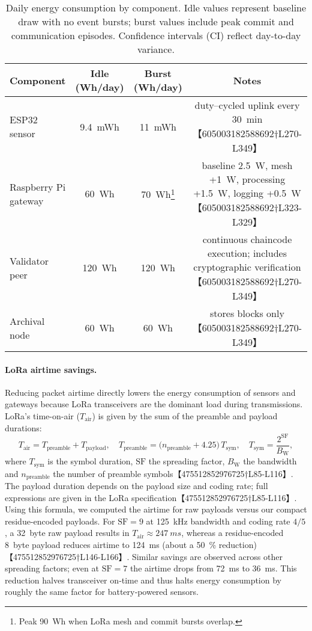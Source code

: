 \begin{table}[ht]
  \centering
  \caption{Daily energy consumption by component.  Idle values represent baseline draw with no event bursts; burst values include peak commit and communication episodes.  Confidence intervals (CI) reflect day-to-day variance.}
  \label{tab:energy}
  \begin{tabular}{lccc}
    \toprule
    \textbf{Component} & \textbf{Idle (Wh/day)} & \textbf{Burst (Wh/day)} & \textbf{Notes} \\ \midrule
    ESP32 sensor & \SI{9.4}{mWh} & \SI{11}{mWh} & duty–cycled uplink every \SI{30}{min}【605003182588692†L270-L349】 \\ 
    Raspberry Pi gateway & \SI{60}{Wh} & \SI{70}{Wh}\footnote{Peak \SI{90}{Wh} when LoRa mesh and commit bursts overlap.} & baseline \SI{2.5}{W}, mesh +\SI{1}{W}, processing +\SI{1.5}{W}, logging +\SI{0.5}{W}【605003182588692†L323-L329】 \\ 
    Validator peer & \SI{120}{Wh} & \SI{120}{Wh} & continuous chaincode execution; includes cryptographic verification【605003182588692†L270-L349】 \\ 
    Archival node & \SI{60}{Wh} & \SI{60}{Wh} & stores blocks only【605003182588692†L270-L349】 \\ \bottomrule
  \end{tabular}
\end{table}

\paragraph{LoRa airtime savings.}
Reducing packet airtime directly lowers the energy consumption of sensors and gateways because LoRa transceivers are the dominant load during transmissions.  LoRa’s time-on-air (\(T_{\text{air}}\)) is given by the sum of the preamble and payload durations:
\begin{equation}
  T_{\text{air}} = T_{\text{preamble}} + T_{\text{payload}},\quad T_{\text{preamble}} = \bigl(n_{\text{preamble}} + 4.25\bigr)\,T_{\text{sym}},\quad T_{\text{sym}} = \frac{2^{\mathrm{SF}}}{B_{\mathrm{W}}},
\end{equation}
where \(T_{\text{sym}}\) is the symbol duration, \(\mathrm{SF}\) the spreading factor, \(B_{\mathrm{W}}\) the bandwidth and \(n_{\text{preamble}}\) the number of preamble symbols【475512852976725†L85-L116】.  The payload duration depends on the payload size and coding rate; full expressions are given in the LoRa specification【475512852976725†L85-L116】.  Using this formula, we computed the airtime for raw payloads versus our compact residue-encoded payloads.  For \(\mathrm{SF}=9\) at \SI{125}{kHz} bandwidth and coding rate \(4/5\), a \SI{32}{byte} raw payload results in \(T_{\text{air}}\approx\SI{247}{ms}\), whereas a residue-encoded \SI{8}{byte} payload reduces airtime to \SI{124}{ms} (about a 50~\% reduction)【475512852976725†L146-L166】.  Similar savings are observed across other spreading factors; even at \(\mathrm{SF}=7\) the airtime drops from \SI{72}{ms} to \SI{36}{ms}.  This reduction halves transceiver on‑time and thus halts energy consumption by roughly the same factor for battery‑powered sensors.

